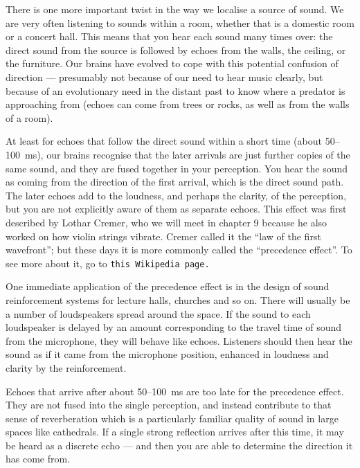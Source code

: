   There is one more important twist in the way we localise a source of sound. 
  We are very often listening to sounds within a room, whether that is a 
  domestic room or a concert hall. This means that you hear each sound many 
  times over: the direct sound from the source is followed by echoes from the 
  walls, the ceiling, or the furniture. Our brains have evolved to cope with 
  this potential confusion of direction — presumably not because of our need to 
  hear music clearly, but because of an evolutionary need in the distant past 
  to know where a predator is approaching from (echoes can come from trees or 
  rocks, as well as from the walls of a room). 

  At least for echoes that follow the direct sound within a short time (about 
  50--100 ms), our brains recognise that the later arrivals are just further 
  copies of the same sound, and they are fused together in your perception. You 
  hear the sound as coming from the direction of the first arrival, which is 
  the direct sound path. The later echoes add to the loudness, and perhaps the 
  clarity, of the perception, but you are not explicitly aware of them as 
  separate echoes. This effect was first described by Lothar Cremer, who we 
  will meet in chapter 9 because he also worked on how violin strings vibrate. 
  Cremer called it the “law of the first wavefront”; but these days it is more 
  commonly called the “precedence effect”. To see more about it, go to 
  \tt{}this Wikipedia page\rm{}. 

  One immediate application of the precedence effect is in the design of sound 
  reinforcement systems for lecture halls, churches and so on. There will 
  usually be a number of loudspeakers spread around the space. If the sound to 
  each loudspeaker is delayed by an amount corresponding to the travel time of 
  sound from the microphone, they will behave like echoes. Listeners should 
  then hear the sound as if it came from the microphone position, enhanced in 
  loudness and clarity by the reinforcement. 

  Echoes that arrive after about 50--100~ms are too late for the precedence 
  effect. They are not fused into the single perception, and instead contribute 
  to that sense of reverberation which is a particularly familiar quality of 
  sound in large spaces like cathedrals. If a single strong reflection arrives 
  after this time, it may be heard as a discrete echo — and then you are able 
  to determine the direction it has come from. 

